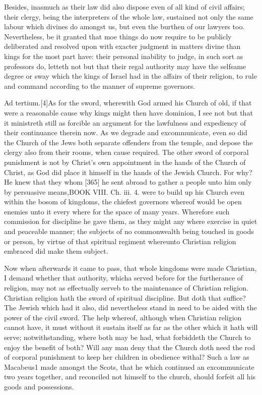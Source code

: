 Besides, inasmuch as their law did also dispose even of all kind of civil affairs; their clergy, being the interpreters of the whole law, sustained not only the same labour which divines do amongst us, but even the burthen of our lawyers too. Nevertheless, be it granted that moe things do now require to be publicly deliberated and resolved upon with exacter judgment in matters divine than kings for the most part have: their personal inability to judge, in such sort as professors do, letteth not but that their regal authority may have the selfsame degree or sway which the kings of Israel had in the affairs of their religion, to rule and command according to the manner of supreme governors.

Ad tertium.[4]As for the sword, wherewith God armed his Church of old, if that were a reasonable cause why kings might then have dominion, I see not but that it ministreth still as forcible an argument for the lawfulness and expediency of their continuance therein now. As we degrade and excommunicate, even so did the Church of the Jews both separate offenders from the temple, and depose the clergy also from their rooms, when cause required. The other sword of corporal punishment is not by Christ’s own appointment in the hands of the Church of Christ, as God did place it himself in the hands of the Jewish Church. For why? He knew that they whom [365] he sent abroad to gather a people unto him only by persuasive means,BOOK VIII. Ch. iii. 4. were to build up his Church even within the bosom of kingdoms, the chiefest governors whereof would be open enemies unto it every where for the space of many years. Wherefore such commission for discipline he gave them, as they might any where exercise in quiet and peaceable manner; the subjects of no commonwealth being touched in goods or person, by virtue of that spiritual regiment whereunto Christian religion embraced did make them subject.

Now when afterwards it came to pass, that whole kingdoms were made Christian, I demand whether that authority, whicha served before for the furtherance of religion, may not as effectually serveb to the maintenance of Christian religion. Christian religion hath the sword of spiritual discipline. But doth that suffice? The Jewish which had it also, did nevertheless stand in need to be aided with the power of the civil sword. The help whereof, although when Christian religion cannot have, it must without it sustain itself as far as the other which it hath will serve; notwithstanding, where both may be had, what forbiddeth the Church to enjoy the benefit of both? Will any man deny that the Church doth need the rod of corporal punishment to keep her children in obedience withal? Such a law as Macabeus1 made amongst the Scots, that he which continued an excommunicate two years together, and reconciled not himself to the church, should forfeit all his goods and possessions.

